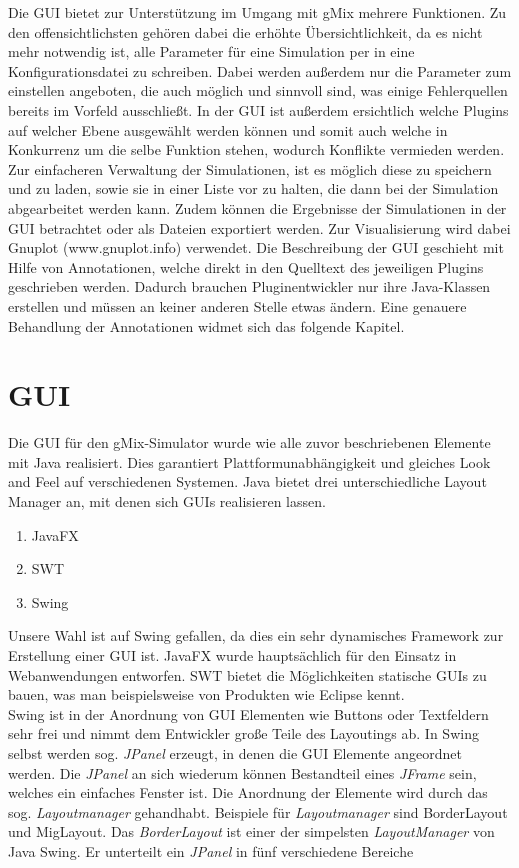 \documentclass[a4paper, 11pt]{article} %
\begin{document}
Die GUI bietet zur Unterstützung im Umgang mit gMix mehrere Funktionen. Zu den offensichtlichsten gehören dabei die erhöhte Übersichtlichkeit, da es nicht mehr notwendig ist, alle Parameter für eine Simulation per in eine Konfigurationsdatei zu schreiben. Dabei werden außerdem nur die Parameter zum einstellen angeboten, die auch möglich und sinnvoll sind, was einige Fehlerquellen bereits im Vorfeld ausschließt. In der GUI  ist außerdem ersichtlich welche Plugins auf welcher Ebene ausgewählt werden können und somit auch welche in Konkurrenz um die selbe Funktion stehen, wodurch Konflikte vermieden werden. Zur einfacheren Verwaltung der Simulationen, ist es möglich diese zu speichern und zu laden, sowie sie in einer Liste vor zu halten, die dann bei der Simulation abgearbeitet werden kann. Zudem können die Ergebnisse der Simulationen in der GUI betrachtet oder als Dateien exportiert werden. Zur Visualisierung wird dabei Gnuplot (www.gnuplot.info) verwendet. Die Beschreibung der GUI geschieht mit Hilfe von Annotationen, welche direkt in den Quelltext des jeweiligen Plugins geschrieben werden. Dadurch brauchen Pluginentwickler nur ihre Java-Klassen erstellen und müssen an keiner anderen Stelle etwas ändern. Eine genauere Behandlung der Annotationen widmet sich das folgende Kapitel.

\section{GUI}
\label{sub:guielemente}
Die GUI für den gMix-Simulator wurde wie alle zuvor beschriebenen Elemente mit Java realisiert. Dies garantiert Plattformunabhängigkeit und gleiches Look and Feel auf verschiedenen Systemen. Java bietet drei unterschiedliche Layout Manager an, mit denen sich GUIs realisieren lassen.
\begin{enumerate}
\item JavaFX
\item SWT
\item Swing
\end{enumerate}
Unsere Wahl ist auf Swing gefallen, da dies ein sehr dynamisches Framework zur Erstellung einer GUI ist. JavaFX wurde hauptsächlich für den Einsatz in Webanwendungen entworfen. SWT bietet die Möglichkeiten statische GUIs zu bauen, was man beispielsweise von Produkten wie  Eclipse kennt.\\

Swing ist in der Anordnung von GUI Elementen wie Buttons oder Textfeldern sehr frei und nimmt dem Entwickler große Teile des Layoutings ab. In Swing selbst werden sog. \emph{JPanel} erzeugt, in denen die GUI Elemente angeordnet werden. Die \emph{JPanel} an sich wiederum können Bestandteil eines \emph{JFrame} sein, welches ein einfaches Fenster ist. Die Anordnung der Elemente wird durch das sog. \emph{Layoutmanager} gehandhabt. Beispiele für \emph{Layoutmanager} sind BorderLayout und MigLayout. Das \emph{BorderLayout} ist einer der simpelsten \emph{LayoutManager} von Java Swing. Er unterteilt ein \emph{JPanel} in fünf verschiedene Bereiche
\end{document}
